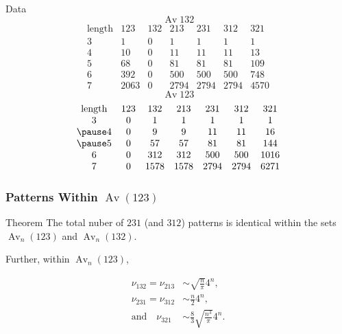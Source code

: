 \documentclass[xcolor=table,dvipsnames]{beamer}
\DeclareMathOperator{\Av}{Av}
\newcommand{\num}{\nu}
\begin{document}
  \begin{frame}{Data}
    \pause
    \vspace{-1pc}
    $$ \Av 132 $$
    $$\begin{array}{ccccccc}
        \text{length} & 123 & 132 & 213 & 231
        & 312 & 321 \\
       3  & 1     &    0  &    1 &    1 &    1 &    1  \\
       4  & 10    &    0  &   11 &   11 &   11 &   13  \\
       5  & 68    &    0  &   81 &   81 &   81 &  109  \\
       6  & 392   &    0  &  500 &  500 &  500 &  748  \\ 
       7  & 2063  &    0  & 2794 & 2794 & 2794 & 4570   
     \end{array}
    $$
    \pause
    $$\Av 123 $$
    $$\begin{array}{ccccccc}
        \text{length} & 123 & 132 & 213 & 231
        & 312 & 321 \\
        3  & 0     &    1  &    1 &    1 &    1 &    1  \\
        \pause
        4  & 0     &    9  &    9 &   11 &   11 &   16  \\
        \pause
        5  & 0     &    57 &   57 &   81 &   81 &  144  \\
        6  & 0     &   312 &  312 &  500 &  500 & 1016  \\ 
        7  & 0     &  1578 & 1578 & 2794 & 2794 & 6271   
      \end{array}
    $$
  \end{frame}

  \begin{frame} \frametitle{Patterns Within $\Av(123)$} \pause

    \begin{block}{Theorem}
      The total nuber of $231$ (and $312$) patterns is identical within the
      sets $\Av_n(123)$ and $\Av_n(132)$. 
      \pause

      Further, within $\Av_n(123)$, 

      $$ \begin{aligned}
         \num_{132} =  \num_{213} &\sim \sqrt{\frac{n}{\pi}} 4^n, \\
         \num_{231} = \num_{312}  &\sim \frac{n}{2} 4^n,  \\
         \text{and} \quad \num_{321} &\sim \frac{8}{3} \sqrt{\frac{n^3}{\pi}} 4^n.
      \end{aligned} $$
    \end{block}


  \end{frame}
\end{document}
